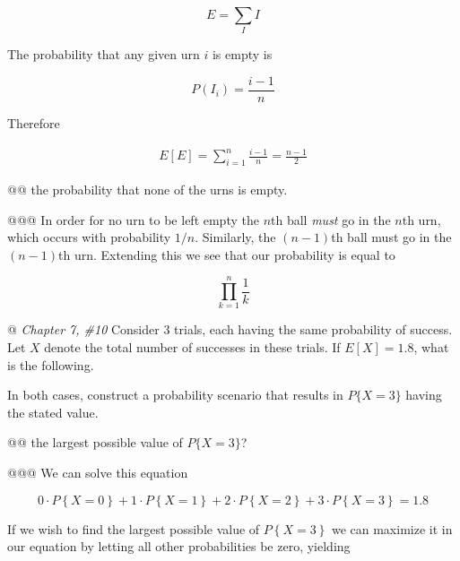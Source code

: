 \documentclass[11pt]{article}\usepackage[]{graphicx}\usepackage[]{xcolor}
\begin{document}
\begin{easylist}[enumerate]
    \begin{equation}
        E = \sum\limits_I I
    \end{equation}

    The probability that any given urn $i$ is empty is

    \begin{equation}
        P(I_i) = \frac{i - 1}{n}
    \end{equation}

    Therefore

    \begin{equation}
        \begin{aligned}
            E[E] = \sum_{i=1}^n \frac{i - 1}{n} = \frac{n-1}{2}
        \end{aligned}
    \end{equation}

    @@ the probability that none of the urns is empty.

    @@@ In order for no urn to be left empty the $n$th ball \textit{must} go in the $n$th urn, which occurs with
    probability $1/n$. Similarly, the $(n-1)$th ball must go in the $(n-1)$th urn. Extending this we see that our
    probability is equal to

    \begin{equation}
        \prod_{k=1}^n \frac{1}{k}
    \end{equation}

    @ \textit{Chapter 7, \#10} Consider 3 trials, each having the same probability of success. Let $X$ denote the total
    number of successes in these trials. If $E[X] = 1.8$, what is the following. \newline

    In both cases, construct a probability scenario that results in $P\{X = 3\}$ having the stated value.

    @@ the largest possible value of $P\{X = 3\}$?

    @@@ We can solve this equation

    \begin{equation}
            0 \cdot P\left\{ X=0 \right\} +
            1 \cdot P\left\{ X=1 \right\} +
            2 \cdot P\left\{ X=2 \right\} +
            3 \cdot P\left\{ X=3 \right\} = 1.8
    \end{equation}

    If we wish to find the largest possible value of $P\left\{ X=3 \right\}$ we can maximize it in our equation by
    letting all other probabilities be zero, yielding


\end{easylist}
\end{document}
